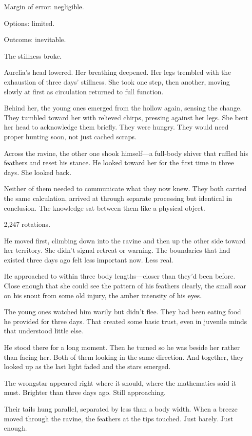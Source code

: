 Margin of error: negligible.

Options: limited.

Outcome: inevitable.

The stillness broke.

Aurelia's head lowered. Her breathing deepened. Her legs trembled with the exhaustion of three days' stillness. She took one step, then another, moving slowly at first as circulation returned to full function.

Behind her, the young ones emerged from the hollow again, sensing the change. They tumbled toward her with relieved chirps, pressing against her legs. She bent her head to acknowledge them briefly. They were hungry. They would need proper hunting soon, not just cached scraps.

Across the ravine, the other one shook himself—a full-body shiver that ruffled his feathers and reset his stance. He looked toward her for the first time in three days. She looked back.

Neither of them needed to communicate what they now knew. They both carried the same calculation, arrived at through separate processing but identical in conclusion. The knowledge sat between them like a physical object.

2,247 rotations.

He moved first, climbing down into the ravine and then up the other side toward her territory. She didn't signal retreat or warning. The boundaries that had existed three days ago felt less important now. Less real.

He approached to within three body lengths—closer than they'd been before. Close enough that she could see the pattern of his feathers clearly, the small scar on his snout from some old injury, the amber intensity of his eyes.

The young ones watched him warily but didn't flee. They had been eating food he provided for three days. That created some basic trust, even in juvenile minds that understood little else.

He stood there for a long moment. Then he turned so he was beside her rather than facing her. Both of them looking in the same direction. And together, they looked up as the last light faded and the stars emerged.

The wrongstar appeared right where it should, where the mathematics said it must. Brighter than three days ago. Still approaching.

Their tails hung parallel, separated by less than a body width. When a breeze moved through the ravine, the feathers at the tips touched. Just barely. Just enough.

